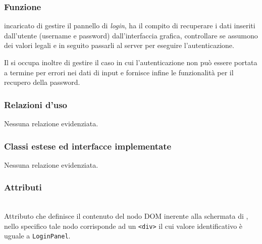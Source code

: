 
\subsubsection*{Funzione}
 incaricato di gestire il pannello di \textit{login}, ha il compito di recuperare i dati inseriti dall'utente (username e password) dall'interfaccia grafica, controllare se assumono dei valori legali e in seguito passarli al server per eseguire l'autenticazione.

Il  si occupa inoltre di gestire il caso in cui l'autenticazione non può essere portata a termine per errori nei dati di input e fornisce infine le funzionalità per il recupero della password.

\subsubsection*{Relazioni d'uso}

Nessuna relazione evidenziata.

\subsubsection*{Classi estese ed interfacce implementate}

Nessuna relazione evidenziata.

\subsubsection*{Attributi}
\begin{description}

\item{}\\
Attributo che definisce il contenuto del nodo DOM inerente alla schermata di , nello specifico tale nodo corrisponde ad un \verb+<div>+ il cui valore identificativo è uguale a \texttt{LoginPanel}.

\end{description}


